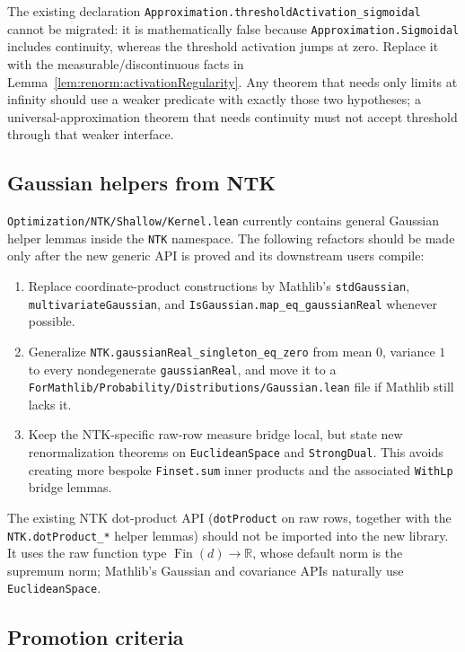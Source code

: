 The existing declaration
\texttt{Approximation.thresholdActivation\_sigmoidal} cannot be migrated: it is mathematically
false because \texttt{Approximation.Sigmoidal} includes continuity, whereas the threshold
activation jumps at zero.  Replace it with the measurable/discontinuous facts in
Lemma~\ref{lem:renorm:activationRegularity}.  Any theorem that needs only limits at infinity should
use a weaker predicate with exactly those two hypotheses; a universal-approximation theorem that
needs continuity must not accept threshold through that weaker interface.

\subsection{Gaussian helpers from NTK}

\texttt{Optimization/NTK/Shallow/Kernel.lean} currently contains general Gaussian helper lemmas inside the
\texttt{NTK} namespace.  The following refactors should be made only after the new generic API is
proved and its downstream users compile:
\begin{enumerate}
  \item Replace coordinate-product constructions by Mathlib's
    \texttt{stdGaussian}, \texttt{multivariateGaussian}, and
    \texttt{IsGaussian.map\_eq\_gaussianReal} whenever possible.
  \item Generalize \texttt{NTK.gaussianReal\_singleton\_eq\_zero} from mean $0$, variance $1$ to
    every nondegenerate \texttt{gaussianReal}, and move it to a
    \texttt{ForMathlib/Probability/Distributions/Gaussian.lean} file if Mathlib still lacks it.
  \item Keep the NTK-specific raw-row measure bridge local, but state new renormalization theorems
    on \texttt{EuclideanSpace} and \texttt{StrongDual}.  This avoids creating more bespoke
    \texttt{Finset.sum} inner products and the associated \texttt{WithLp} bridge lemmas.
\end{enumerate}

The existing NTK dot-product API (\texttt{dotProduct} on raw rows, together with the \texttt{NTK.dotProduct\_*}
helper lemmas) should not be imported into the new library.  It uses
the raw function type $\operatorname{Fin}(d)\to\mathbb R$, whose default norm is the supremum norm;
Mathlib's Gaussian and covariance APIs naturally use \texttt{EuclideanSpace}.

\subsection{Promotion criteria}

